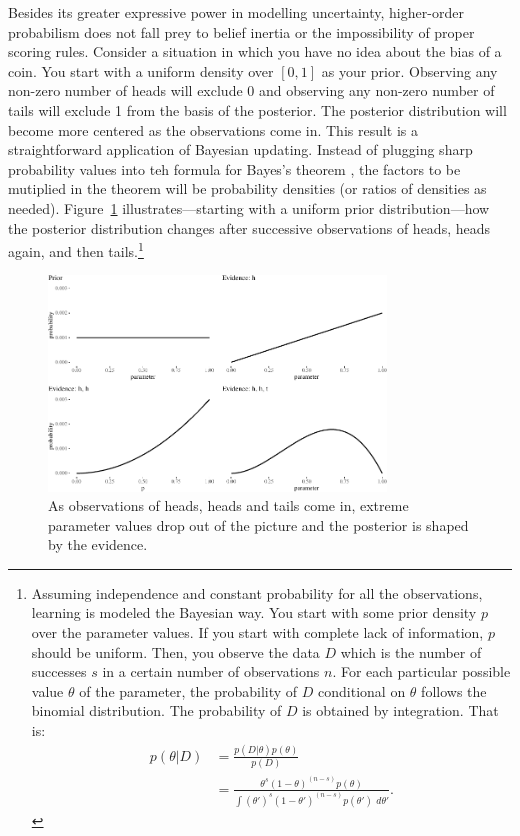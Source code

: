 \documentclass[
  letterpaper,
  DIV=11,
  numbers=noendperiod]{scrartcl}
\begin{document}
Besides its greater expressive power in modelling uncertainty,
higher-order probabilism does not fall prey to belief inertia or the
impossibility of proper scoring rules. Consider a situation in which you
have no idea about the bias of a coin. You start with a uniform density
over \([0,1]\) as your prior. Observing any non-zero number of heads
will exclude 0 and observing any non-zero number of tails will exclude 1
from the basis of the posterior. The posterior distribution will become
more centered as the observations come in. This result is a
straightforward application of Bayesian updating. Instead of plugging
sharp probability values into teh formula for Bayes's theorem , the
factors to be mutiplied in the theorem will be probability densities (or
ratios of densities as needed). Figure~\ref{fig-intertia2}
illustrates---starting with a uniform prior distribution---how the
posterior distribution changes after successive observations of heads,
heads again, and then tails.\footnote{Assuming independence and constant
  probability for all the observations, learning is modeled the Bayesian
  way. You start with some prior density \(p\) over the parameter
  values. If you start with complete lack of information, \(p\) should
  be uniform. Then, you observe the data \(D\) which is the number of
  successes \(s\) in a certain number of observations \(n\). For each
  particular possible value \(\theta\) of the parameter, the probability
  of \(D\) conditional on \(\theta\) follows the binomial distribution.
  The probability of \(D\) is obtained by integration. That is:
  \begin{align*}
  p(\theta \vert D) & = \frac{p(D\vert \theta)p(\theta)}{p(D)}\\
  & = \frac{\theta^s (1-\theta)^{(n - s)}p(\theta)}{\int (\theta')^s (1-\theta')^{(n - s)}p(\theta')\,\, d\theta'}.
  \end{align*}}

\begin{figure}

{\centering \includegraphics[width=0.8\textwidth,height=\textheight]{imp_philosophical_backup_files/figure-pdf/fig-intertia2-1.pdf}

}

\caption{\label{fig-intertia2}As observations of heads, heads and tails
come in, extreme parameter values drop out of the picture and the
posterior is shaped by the evidence.}

\end{figure}
\end{document}
